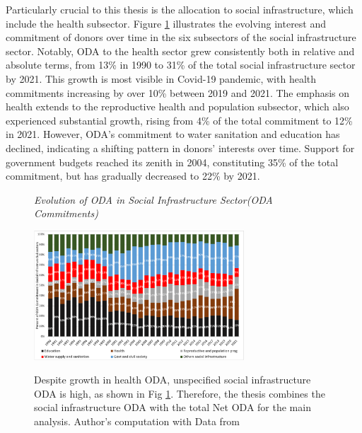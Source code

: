 Particularly crucial to this thesis is the allocation to social infrastructure, which include the health subsector. Figure \ref{fig:Subsector of Social Infrastructure} illustrates the evolving interest and commitment of donors over time in the six subsectors of the social infrastructure sector. Notably, ODA to the health sector grew consistently both in relative and absolute terms, from 13\% in 1990 to 31\% of the total social infrastructure sector by 2021. This growth is most visible in Covid-19 pandemic, with health commitments increasing by over 10\% between 2019 and 2021. The emphasis on health extends to the reproductive health and population subsector, which also experienced substantial growth, rising from 4\% of the total commitment to 12\% in 2021. However, ODA's commitment to water sanitation and education has declined, indicating a shifting pattern in donors' interests over time. Support for government budgets reached its zenith in 2004, constituting 35\% of the total commitment, but has gradually decreased to 22\% by 2021.

\begin{figure}[ht]
\captionsetup{justification=justified,singlelinecheck=false}
\caption{\textit{Evolution of ODA in Social Infrastructure Sector(ODA Commitments)}}
    \centering \includegraphics[width = 0.7\textwidth]{Figures/ODA_Graphs/Subsectors_soc_inf.pdf}
    \label{fig:Subsector of Social Infrastructure}
    \caption*{\footnotesize{Despite growth in health ODA, unspecified social infrastructure ODA is high, as shown in Fig \ref{fig:Subsector of Social Infrastructure}. Therefore, the thesis combines the social infrastructure ODA with the total Net ODA for the main analysis. Author's computation with Data from \textcite{oecd_Data_2023}}}
\end{figure}

